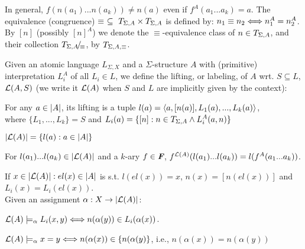 \documentclass[12pt]{article}
\begin{document}
In general, $f(n(a_1)...n(a_k)) \not= n(a)$ even if $f^A(a_1...a_k) = a$. The
equivalence (congruence) $\equiv\ \subseteq\ \diag A\times\diag A$ is defined
by: $n_1\equiv n_2 \Longleftrightarrow n_1^A=n_2^A$. By $[n]$ (possibly $[n]^A$) we denote the $\equiv$-equivalence
class of $n\in T_{\Sigma,A}$, and their
collection $T_{\Sigma,A}\!{\textstyle /}\!_{\equiv}$, by $T_{\Sigma,A,\equiv}$.
\begin{Definition}
Given  an atomic language $L_{\Sigma,X}$ and a $\Sigma$-structure $A$ with
(primitive) interpretation $L_i^A$ of all $L_i\in L$, we define the
lifting, or labeling, of $A$ wrt. $S\subseteq L$, ${\cal L}(A,S)$ (we write it 
${\cal L}(A)$ when $S$ and $L$ are implicitly given by the context): 
\begin{enum}
\item For  any $a\in|A|$, its lifting is a tuple $l(a)=
\langle a,[n(a)],L_1(a),...,L_k(a)\rangle$,\\ where $\{L_1,...,L_k\}=S$ and $L_i(a) =\{[n]:n\in T_{\Sigma,A}\land
L_i^A(a,n)\}$
\item $|{\cal L}(A)| = \{l(a):a\in|A|\}$
\item For $l(a_1)...l(a_k)\in|{\cal L}(A)|$ and a $k$-ary $f\in\mbox{\bf{\em F}}$,
$f^{{\cal L}(A)}(l(a_1)...l(a_k)) = l(f^A(a_1...a_k))$.
\end{enum}
If $x\in|{\cal L}(A)|:el(x)\in|A|$ is s.t.
$l(el(x))=x$, $n(x)= [n(el(x))]$  and $L_i(x)=L_i(el(x))$.
\\
Given an assignment $\alpha:X\rightarrow|{\cal L}(A)|$:
\begin{enum}\setcounter{enumi}{3}
\item ${\cal L}(A)\models_\alpha L_i(x,y) \Longleftrightarrow n(\alpha(y))\in L_i(\alpha(x))$.
\item ${\cal L}(A)\models_\alpha x=y \Longleftrightarrow n(\alpha(x))\in\{n(\alpha(y)\}$, i.e., $n(\alpha(x))= n(\alpha(y))$
\end{enum}
\end{Definition}
\end{document}
